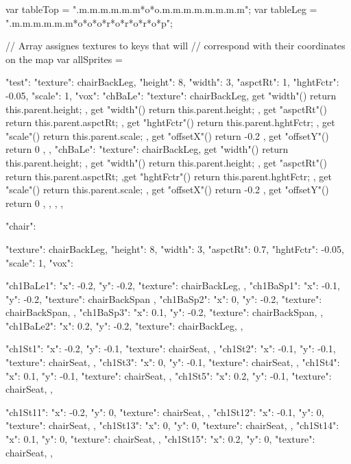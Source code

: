 var tableTop = ".m.m.m.m.m.m*o*o.m.m.m.m.m.m.m.m";
var tableLeg = ".m.m.m.m.m.m*o*o*o*r*o*r*o*r*o*p";



// Array assignes textures to keys that will
// correspond with their coordinates on the map
var allSprites = {

  "test": {
    "texture": chairBackLeg,
    "height": 8,
    "width": 3,
    "aspctRt": 1,
    "hghtFctr": -0.05,
    "scale": 1,
    "vox": {
      "chBaLe": {
        "texture": chairBackLeg,
        get "width"() { return this.parent.height; },
        get "width"() { return this.parent.height; },
        get "aspctRt"() { return this.parent.aspctRt; },
        get "hghtFctr"() { return this.parent.hghtFctr; },
        get "scale"() { return this.parent.scale; },
        get "offsetX"() { return -0.2 },
        get "offsetY"() { return 0 },
      },  
      "chBaLe": {
        "texture": chairBackLeg,
        get "width"() { return this.parent.height; }, get "width"() { return this.parent.height; }, get "aspctRt"() { return this.parent.aspctRt; },get "hghtFctr"() { return this.parent.hghtFctr; }, get "scale"() { return this.parent.scale; },
        get "offsetX"() { return -0.2 },
        get "offsetY"() { return 0 },
      },  
    },
  },

  "chair": {
    "texture": chairBackLeg,
    "height": 8,
    "width": 3,
    "aspctRt": 0.7,
    "hghtFctr": -0.05,
    "scale": 1,
    "vox": {
      "ch1BaLe1":{ "x": -0.2, "y": -0.2, "texture": chairBackLeg, },
      "ch1BaSp1":{ "x": -0.1, "y": -0.2, "texture": chairBackSpan },
      "ch1BaSp2":{ "x": 0,    "y": -0.2, "texture": chairBackSpan, },
      "ch1BaSp3":{ "x": 0.1,  "y": -0.2, "texture": chairBackSpan, },
      "ch1BaLe2":{ "x": 0.2,  "y": -0.2, "texture": chairBackLeg, },

      "ch1St1":{ "x": -0.2,   "y": -0.1, "texture": chairSeat, },
      "ch1St2":{ "x": -0.1,   "y": -0.1, "texture": chairSeat, },
      "ch1St3":{ "x": 0,      "y": -0.1, "texture": chairSeat, },
      "ch1St4":{ "x": 0.1,    "y": -0.1, "texture": chairSeat, },
      "ch1St5":{ "x": 0.2,    "y": -0.1, "texture": chairSeat, },

      "ch1St11":{ "x": -0.2,  "y": 0, "texture": chairSeat, },
      "ch1St12":{ "x": -0.1,  "y": 0, "texture": chairSeat, },
      "ch1St13":{ "x": 0,     "y": 0, "texture": chairSeat, },
      "ch1St14":{ "x": 0.1,   "y": 0, "texture": chairSeat, },
      "ch1St15":{ "x": 0.2,   "y": 0, "texture": chairSeat, },

}}}

